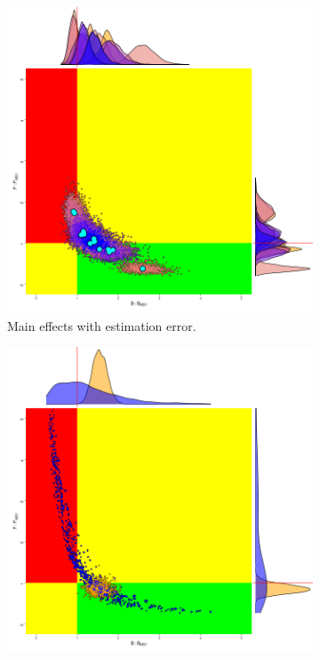 \begin{figure}
     \begin{subfigure}[b]{0.5\textwidth}
               \includegraphics[width=\linewidth]{figures/kobe-main-1.png}
                \caption{Main effects with estimation error.}
                \label{fig:kobe-main}
     \end{subfigure}%
       \begin{subfigure}[b]{0.5\textwidth}
                \includegraphics[width=\linewidth]{figures/kobe-bg-1.png}

\end{subfigure}
\end{figure}
